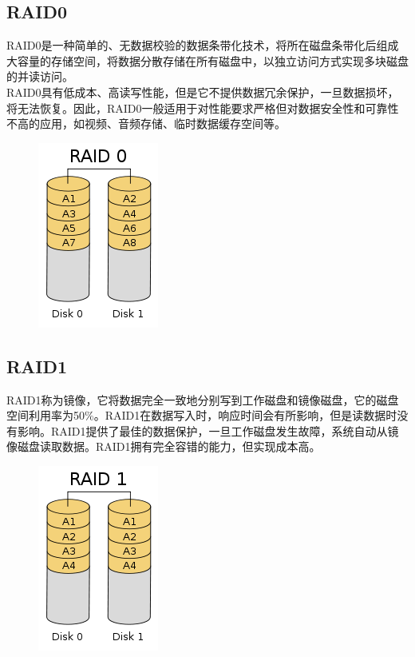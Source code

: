 \subsection{RAID0}

RAID0是一种简单的、无数据校验的数据条带化技术，将所在磁盘条带化后组成大容量的存储空间，将数据分散存储在所有磁盘中，以独立访问方式实现多块磁盘的并读访问。 \\

RAID0具有低成本、高读写性能，但是它不提供数据冗余保护，一旦数据损坏，将无法恢复。因此，RAID0一般适用于对性能要求严格但对数据安全性和可靠性不高的应用，如视频、音频存储、临时数据缓存空间等。

\begin{figure}[H]
	\centering
	\includegraphics[]{img/C4/4-5/1.png}
\end{figure}

\subsection{RAID1}

RAID1称为镜像，它将数据完全一致地分别写到工作磁盘和镜像磁盘，它的磁盘空间利用率为50\%。RAID1在数据写入时，响应时间会有所影响，但是读数据时没有影响。RAID1提供了最佳的数据保护，一旦工作磁盘发生故障，系统自动从镜像磁盘读取数据。RAID1拥有完全容错的能力，但实现成本高。

\begin{figure}[H]
	\centering
	\includegraphics[]{img/C4/4-5/2.png}
\end{figure}

